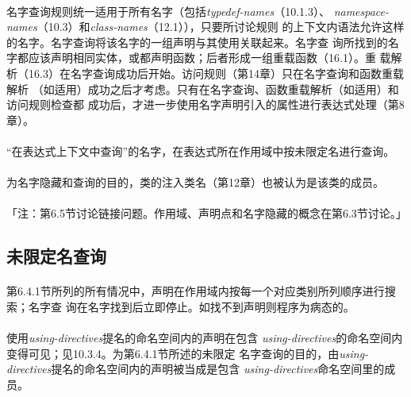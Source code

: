 \paragraph{}
名字查询规则统一适用于所有名字（包括\textit{typedef-names}（10.1.3）、
\textit{namespace-names}（10.3）和\textit{class-names}（12.1）），只要所讨论规则
的上下文内语法允许这样的名字。名字查询将该名字的一组声明与其使用关联起来。名字查
询所找到的名字都应该声明相同实体，或都声明函数；后者形成一组重载函数（16.1）。重
载解析（16.3）在名字查询成功后开始。访问规则（第14章）只在名字查询和函数重载解析
（如适用）成功之后才考虑。只有在名字查询、函数重载解析（如适用）和访问规则检查都
成功后，才进一步使用名字声明引入的属性进行表达式处理（第8章）。

\paragraph{}
``在表达式上下文中查询''的名字，在表达式所在作用域中按未限定名进行查询。

\paragraph{}
为名字隐藏和查询的目的，类的注入类名（第12章）也被认为是该类的成员。

\paragraph{}
「注：第6.5节讨论链接问题。作用域、声明点和名字隐藏的概念在第6.3节讨论。」

\subsection{未限定名查询}
\paragraph{}
第6.4.1节所列的所有情况中，声明在作用域内按每一个对应类别所列顺序进行搜索；名字查
询在名字找到后立即停止。如找不到声明则程序为病态的。

\paragraph{}
使用\textit{using-directives}提名的命名空间内的声明在包含
\textit{using-directives}的命名空间内变得可见；见10.3.4。为第6.4.1节所述的未限定
名字查询的目的，由\textit{using-directives}提名的命名空间内的声明被当成是包含
\textit{using-directives}命名空间里的成员。

